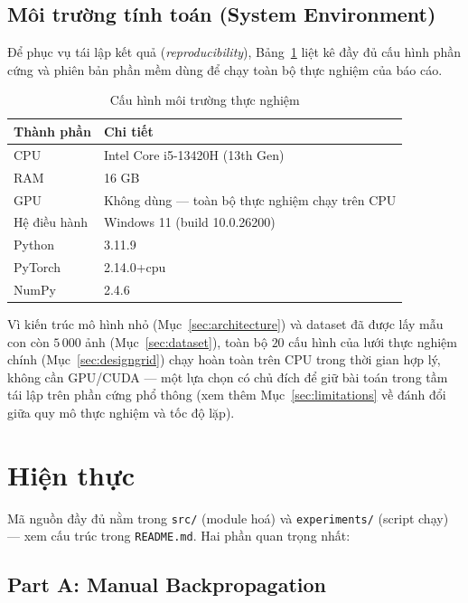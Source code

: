 \documentclass[12pt,a4paper]{article}
\newcommand{\en}[1]{\textit{#1}}
\begin{document}
\subsection{Môi trường tính toán (System Environment)}
\label{sec:sysenv}

Để phục vụ tái lập kết quả (\en{reproducibility}), Bảng~\ref{tab:sysenv}
liệt kê đầy đủ cấu hình phần cứng và phiên bản phần mềm dùng để chạy toàn
bộ thực nghiệm của báo cáo.

\begin{table}[htbp]
\centering
\caption{Cấu hình môi trường thực nghiệm}
\small
\begin{tabular}{@{}ll@{}}
\toprule
\textbf{Thành phần} & \textbf{Chi tiết} \\
\midrule
CPU & Intel Core i5-13420H (13th Gen) \\
RAM & 16 GB \\
GPU & Không dùng --- toàn bộ thực nghiệm chạy trên CPU \\
Hệ điều hành & Windows 11 (build 10.0.26200) \\
Python & 3.11.9 \\
PyTorch & 2.14.0+cpu \\
NumPy & 2.4.6 \\
\bottomrule
\end{tabular}
\label{tab:sysenv}
\end{table}

Vì kiến trúc mô hình nhỏ (Mục~\ref{sec:architecture}) và dataset đã được
lấy mẫu con còn $5\,000$ ảnh (Mục~\ref{sec:dataset}), toàn bộ $20$ cấu
hình của lưới thực nghiệm chính (Mục~\ref{sec:designgrid}) chạy hoàn toàn
trên CPU trong thời gian hợp lý, không cần GPU/CUDA --- một lựa chọn có
chủ đích để giữ bài toán trong tầm tái lập trên phần cứng phổ thông (xem
thêm Mục~\ref{sec:limitations} về đánh đổi giữa quy mô thực nghiệm và tốc
độ lặp).

\section{Hiện thực}
\label{sec:implementation}

Mã nguồn đầy đủ nằm trong \texttt{src/} (module hoá) và
\texttt{experiments/} (script chạy) --- xem cấu trúc trong
\texttt{README.md}. Hai phần quan trọng nhất:

\subsection{Part A: Manual Backpropagation}
\end{document}
